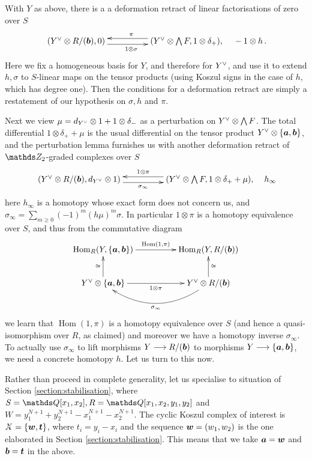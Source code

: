 \documentclass{compositio}
\theoremstyle{definition}
\numberwithin{equation}{section}
\def\Hom{\operatorname{Hom}}
\begin{document}
With $Y$ as above, there is a a deformation retract of linear factorisations of zero over $S$
\begin{equation}\label{eq:pre_perturb_htm3}
\xymatrix@C+2pc{
(Y\mdual \otimes R/(\bb), 0) \ar@<-0.8ex>[r]_{1 \otimes \sigma} & (Y\mdual \otimes \bigwedge F, 1 \otimes \delta_+), \ar@<-0.8ex>[l]_{\pi}
} \quad - 1 \otimes h \, .
\end{equation}
Here we fix a homogeneous basis for $Y$, and therefore for $Y^{\vee}$, and use it to extend $h, \sigma$ to $S$-linear maps on the tensor products (using Koszul signs in the case of $h$, which has degree one). Then the conditions for a deformation retract are simply a restatement of our hypothesis on $\sigma, h$ and $\pi$. 

Next we view $\mu = d_{Y^{\vee}} \otimes 1 + 1 \otimes \delta_{-}$ as a perturbation on $Y^{\vee} \otimes \bigwedge F$. The total differential $1 \otimes \delta_+ + \mu$ is the usual differential on the tensor product $Y^{\vee} \otimes \{ \boldsymbol{a}, \boldsymbol{b} \}$, and the perturbation lemma furnishes us with another deformation retract of $\Ztwo$-graded complexes over $S$
\[
\xymatrix@C+2pc{
(Y\mdual \otimes R/(\bb), d_{Y\mdual}\otimes 1) \ar@<-0.8ex>[r]_-{\sigma_\infty} & (Y\mdual \otimes \bigwedge F, 1 \otimes \delta_+ + \mu), \ar@<-0.8ex>[l]_-{1 \otimes \pi}
} \quad h_\infty
\]
here $h_\infty$ is a homotopy whose exact form does not concern us, and $\sigma_\infty = \sum_{m \ge 0} (-1)^m (h \mu)^m \sigma$. In particular $1 \otimes \pi$ is a homotopy equivalence over $S$, and thus from the commutative diagram
\begin{equation}\label{eq:cons3}
\xymatrix@C+2pc{
\Hom_R(Y, \{\ba, \bb\}) \ar[r]^-{\Hom(1,\pi)} & \Hom_R(Y, R/(\bb))\\
Y^{\lor} \otimes \{ \ba, \bb \} \ar[u]^{\cong} \ar[r]_-{1 \otimes \pi} & Y^{\lor} \otimes R/(\bb) \ar@/^2pc/[l]^-{\sigma_\infty} \ar[u]_{\cong}
}
\end{equation}
we learn that $\Hom(1,\pi)$ is a homotopy equivalence over $S$ (and hence a quasi-isomorphism over $R$, as claimed) and moreover we have a homotopy inverse $\sigma_\infty$. To actually use $\sigma_\infty$ to lift morphisms $Y \longrightarrow R/(\boldsymbol{b})$ to morphisms $Y \longrightarrow \{ \boldsymbol{a}, \boldsymbol{b} \}$, we need a concrete homotopy $h$. Let us turn to this now.

Rather than proceed in complete generality, let us specialise to situation of Section \ref{section:stabilisation}, where $S = \QQ[x_1, x_2], R = \QQ[x_1,x_2,y_1,y_2]$ and $W = y_1^{N+1} + y_2^{N+1} - x_1^{N+1} - x_2^{N+1}$. The cyclic Koszul complex of interest is $\Xcirc = \{ \bs{w}, \bs{t} \}$, where $t_i = y_i - x_i$ and the sequence $\boldsymbol{w} = (w_1,w_2)$ is the one elaborated in Section \ref{section:stabilisation}. This means that we take $\boldsymbol{a}=\boldsymbol{w}$ and $\boldsymbol{b} = \boldsymbol{t}$ in the above. 
\end{document}

